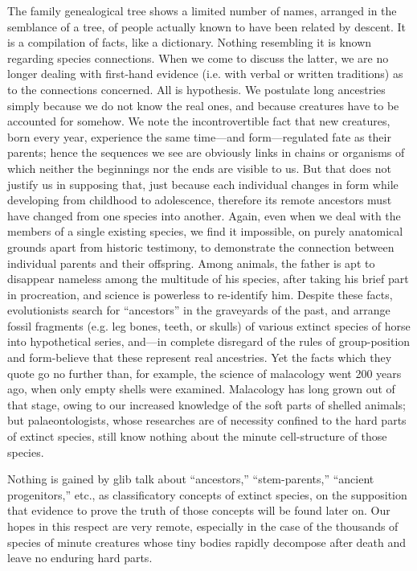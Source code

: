 The family genealogical tree shows a limited number of names, arranged in the semblance of
a tree, of people actually known to have been related by descent. It is a compilation of facts,
like a dictionary. Nothing resembling it is known regarding species connections. When we
come to discuss the latter, we are no longer dealing with first-hand evidence (i.e. with verbal
or written traditions) as to the connections concerned. All is hypothesis. We postulate long
ancestries simply because we do not know the real ones, and because creatures have to be
accounted for somehow. We note the incontrovertible fact that new creatures, born every
year, experience the same time—and form—regulated fate as their parents; hence the
sequences we see are obviously links in chains or organisms of which neither the beginnings
nor the ends are visible to us. But that does not justify us in supposing that, just because each
individual changes in form while developing from childhood to adolescence, therefore its
remote ancestors must have changed from one species into another. Again, even when we
deal with the members of a single existing species, we find it impossible, on purely
anatomical grounds apart from historic testimony, to demonstrate the connection between
individual parents and their offspring. Among animals, the father is apt to disappear nameless
among the multitude of his species, after taking his brief part in procreation, and science is
powerless to re-identify him. Despite these facts, evolutionists search for ``ancestors'' in the
graveyards of the past, and arrange fossil fragments (e.g. leg bones, teeth, or skulls) of
various extinct species of horse into hypothetical series, and—in complete disregard of the
rules of group-position and form-believe that these represent real ancestries. Yet the facts
which they quote go no further than, for example, the science of malacology went 200 years
ago, when only empty shells were examined. Malacology has long grown out of that stage,
owing to our increased knowledge of the soft parts of shelled animals; but palaeontologists,
whose researches are of necessity confined to the hard parts of extinct species, still know
nothing about the minute cell-structure of those species.

Nothing is gained by glib talk about ``ancestors,'' ``stem-parents,'' ``ancient progenitors,'' etc.,
as classificatory concepts of extinct species, on the supposition that evidence to prove the
truth of those concepts will be found later on. Our hopes in this respect are very remote,
especially in the case of the thousands of species of minute creatures whose tiny bodies
rapidly decompose after death and leave no enduring hard parts.

